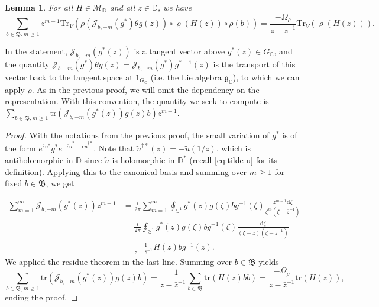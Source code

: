 \documentclass[12pt,a4paper]{amsart}
\numberwithin{equation}{section}
\newtheorem{lemma}[theorem]{Lemma}
\theoremstyle{remark}
\theoremstyle{definition}
\newcommand{\kg}{\mathfrak g}
\newcommand{\C}{\mathbb C}
\renewcommand{\S}{\mathbb S}
\newcommand{\D}{\mathbb D}
\renewcommand{\d}{\mathrm d}
\newcommand{\kB}{\mathfrak B}
\newcommand{\cJ}{\mathcal J}
\newcommand{\cM}{\mathcal M}
\newcommand{\tr}{\mathrm{tr}}
\begin{document}
\begin{lemma}\label{lem:var2}
    For all $H\in\cM_\D$ and all $z\in\D$, we have
    \[\sum_{b\in\kB,m\geq1}z^{m-1}\mathrm{Tr}_V\left(\rho(\cJ_{b,-m}(g^*)\theta g(z))\circ\varrho(H(z))\circ\rho(b)\right)=\frac{-\Omega_\rho}{z-\bar z^{-1}}\mathrm{Tr}_V(\varrho(H(z))).\]
\end{lemma}
In the statement, $\cJ_{b,-m}(g^*(z))$ is a tangent vector above $g^*(z)\in G_\C$, and the quantity $\cJ_{b,-m}(g^*)\theta g(z)=\cJ_{b,-m}(g^*)g^{*-1}(z)$ is the transport of this vector back to the tangent space at $1_{G_\C}$ (i.e. the Lie algebra $\kg_\C$), to which we can apply $\rho$. As in the previous proof, we will omit the dependency on the representation. With this convention, the quantity we seek to compute is $\sum_{b\in\kB,m\geq1}\tr(\cJ_{b,-m}(g^*(z))g(z)b)z^{m-1}$.

\begin{proof}
 With the notations from the previous proof, the small variation of $g^*$ is of the form $e^{\bar\epsilon u^*}g^*e^{-\bar\epsilon\tilde u^*-\epsilon\tilde u^{\dagger*}}$. Note that $\tilde u^{\dagger*}(z)=-\tilde u(1/\bar z)$, which is antiholomorphic in $\D$ since $\tilde u$ is holomorphic in $\D^*$ (recall \eqref{eq:tilde-u} for its definition). Applying this to the canonical basis and summing over $m\geq1$ for fixed $b\in\kB$, we get


    \begin{equation}\label{eq:var-g-star}
    \begin{aligned}
    \sum_{m=1}^\infty\cJ_{b,-m}(g^*(z))z^{m-1}
    &=\frac{i}{2\pi}\sum_{m=1}^\infty\oint_{\S^1}g^*(z)g(\zeta)bg^{-1}(\zeta)\frac{z^{m-1}\d\zeta}{\zeta^m(\zeta-\bar z^{-1})}\\
    &=\frac{i}{2\pi}\oint_{\S^1} g^*(z)g(\zeta)bg^{-1}(\zeta)\frac{\d\zeta}{(\zeta-z)(\zeta-\bar z^{-1})}\\
    &=\frac{-1}{z-\bar z^{-1}}H(z)bg^{-1}(z).
    \end{aligned}
    \end{equation}
We applied the residue theorem in the last line. Summing over $b\in\kB$ yields
\[\sum_{b\in\kB,m\geq1}\tr(\cJ_{b,-m}(g^*(z))g(z)b)=\frac{-1}{z-\bar z^{-1}}\sum_{b\in\kB}\tr(H(z)bb)=\frac{-\Omega_\rho}{z-\bar z^{-1}}\tr(H(z)),\]
ending the proof.
\end{proof}
\end{document}

